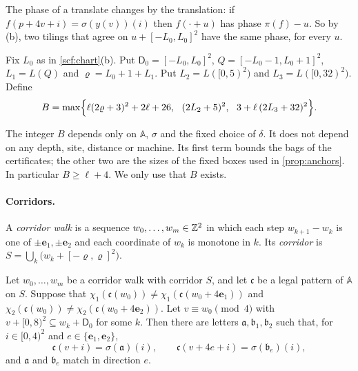 The phase of a translate changes by the translation: if $f(p+4v+i)=\sigma(y(v))(i)$ then $f(\cdot+u)$ has phase $\pi(f)-u$. So by (b), two tilings that agree on $u+[-L_0,L_0]^2$ have the same phase, for every $u$.

\begin{definition}[Constants]\label{scf:def-constants}
Fix $L_0$ as in \cref{scf:chart}(b). Put $\mathsf D_0=[-L_0,L_0]^2$, $Q=[-L_0-1,L_0+1]^2$, $L_1=L(Q)$ and $\varrho=L_0+1+L_1$. Put $L_2=L([0,5)^2)$ and $L_3=L([0,32)^2)$. Define
\[
B=\max\Bigl\{\ell(2\varrho+3)^2+2\ell+26,\ \ (2L_2+5)^2,\ \ 3+\ell\,(2L_3+32)^2\Bigr\}.
\]
\end{definition}

The integer $B$ depends only on $\mathbb A$, $\sigma$ and the fixed choice of $\delta$. It does not depend on any depth, site, distance or machine. Its first term bounds the bags of the certificates; the other two are the sizes of the fixed boxes used in \cref{prop:anchors}. In particular $B\ge\ell+4$. We only use that $B$ exists.

\paragraph{Corridors.} A \emph{corridor walk} is a sequence $w_0,\dots,w_m\in\mathbb{Z}^2$ in which each step $w_{k+1}-w_k$ is one of $\pm\mathbf e_1,\pm\mathbf e_2$ and each coordinate of $w_k$ is monotone in $k$. Its \emph{corridor} is $S=\bigcup_k\bigl(w_k+[-\varrho,\varrho]^2\bigr)$.

\begin{lemma}\label{scf:corridor}
Let $w_0,\dots,w_m$ be a corridor walk with corridor $S$, and let $\mathfrak c$ be a legal pattern of $\mathbb A$ on $S$. Suppose that $\chi_1(\mathfrak c(w_0))\ne\chi_1(\mathfrak c(w_0+4\mathbf e_1))$ and $\chi_2(\mathfrak c(w_0))\ne\chi_2(\mathfrak c(w_0+4\mathbf e_2))$. Let $v\equiv w_0\pmod4$ with $v+[0,8)^2\subseteq w_k+\mathsf D_0$ for some $k$. Then there are letters $\mathfrak a,\mathfrak b_1,\mathfrak b_2$ such that, for $i\in[0,4)^2$ and $e\in\{\mathbf e_1,\mathbf e_2\}$,
\[
\mathfrak c(v+i)=\sigma(\mathfrak a)(i),\qquad \mathfrak c(v+4e+i)=\sigma(\mathfrak b_e)(i),
\]
and $\mathfrak a$ and $\mathfrak b_e$ match in direction $e$.
\end{lemma}


